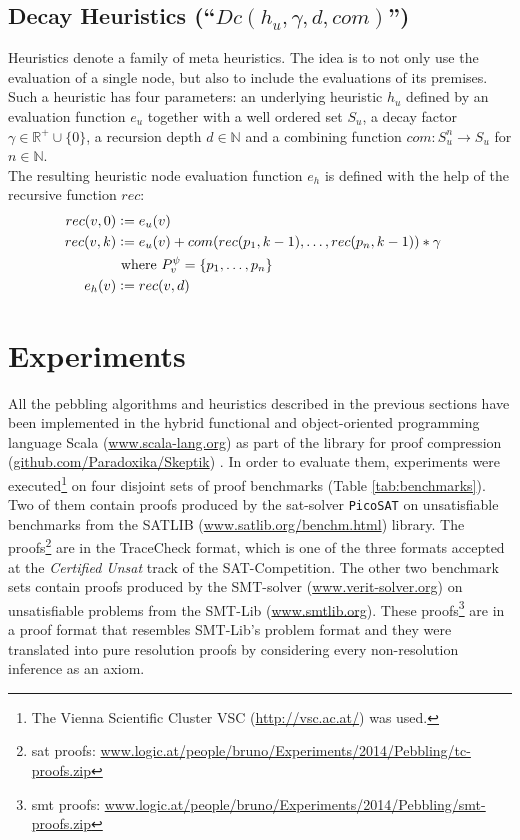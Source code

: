 \documentclass{llncs}
\newcommand{\defeq}{\mathrel{\mathop:}=}
\begin{document}
\subsection{Decay Heuristics (``$Dc(h_u,\gamma,d,com)$'') }
\label{sec:decay}
 Heuristics denote a family of meta heuristics. 
The idea is to not only use the evaluation of a single node, but also to include the evaluations of its premises.
Such a heuristic has four parameters: an underlying heuristic $h_u$ defined by an evaluation function $e_u$ together with a well ordered set $S_u$, a decay factor $\gamma \in \mathbb{R}^+ \cup \{0\}$, a recursion depth $d \in \mathbb{N}$ and a combining function $com: S_u^n \rightarrow S_u$ for $n \in \mathbb{N}$.\\
The resulting heuristic node evaluation function $e_h$ is defined with the help of the recursive function $rec$:
\begin{align*}
	rec(\n,0) &\defeq e_u(\n) \\
	rec(\n,k) &\defeq e_u(\n) + com(rec(p_1,k-1),\ldots,rec(p_n,k-1)) * \gamma\\
	& \text{ where } \Premises{\n}{\psi} = \{p_1,\ldots,p_n\}\\
	e_h(\n) &\defeq rec(\n,d) &
\end{align*}


\section{Experiments} 
\label{sec:exp}


All the pebbling algorithms and heuristics described in the previous sections have been implemented in the hybrid functional and object-oriented programming
language Scala (\url{www.scala-lang.org}) as part of the \skeptik library for proof compression (\url{github.com/Paradoxika/Skeptik}) \cite{Skeptik}.
In order to evaluate them, experiments were executed\footnote{The Vienna Scientific Cluster VSC 
(\url{http://vsc.ac.at/}) was used.} on four disjoint sets of proof benchmarks (Table \ref{tab:benchmarks}). Two of them contain proofs produced by the sat-solver \texttt{PicoSAT} \cite{Biere_picosatessentials} on unsatisfiable benchmarks from the SATLIB (\url{www.satlib.org/benchm.html}) library. The proofs\footnote{sat proofs: \url{www.logic.at/people/bruno/Experiments/2014/Pebbling/tc-proofs.zip}} are in the TraceCheck format, which is one of the three formats accepted at the \emph{Certified Unsat} track of the SAT-Competition.
The other two benchmark sets contain proofs produced by the SMT-solver {\veriT} (\url{www.verit-solver.org}) 
on unsatisfiable problems from the SMT-Lib (\url{www.smtlib.org}). These proofs\footnote{smt proofs: \url{www.logic.at/people/bruno/Experiments/2014/Pebbling/smt-proofs.zip}} are in a proof format that resembles SMT-Lib's problem format and they were translated into pure resolution proofs by considering every non-resolution inference as an axiom.
\end{document}
